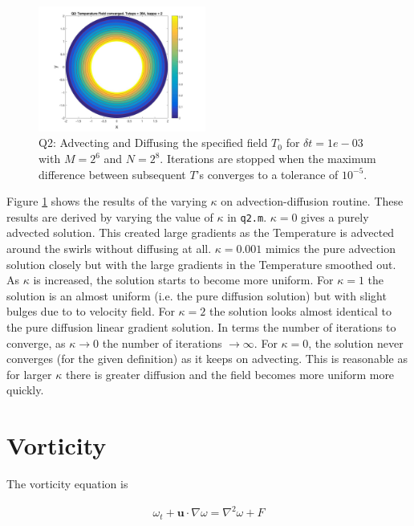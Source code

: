 \documentclass{article}
\begin{document}
\begin{figure}[h!]
		\includegraphics[width = 0.49\textwidth]{fig_q2Kappa2}
		\caption{Q2: Advecting and Diffusing the specified field $T_0$ for $\delta t = 1e-03$ with $M = 2^6$ and $N=2^8$. Iterations are stopped when the maximum difference between subsequent $T$'s converges to a tolerance of $10^{-5}$.}
		\label{fig:q2Kappa}
	\end{figure}

Figure \ref{fig:q2Kappa} shows the results of the varying $\kappa$ on advection-diffusion routine. These results are derived by varying the value of $\kappa$ in \texttt{q2.m}. $\kappa = 0$ gives a purely advected solution. This created large gradients as the Temperature is advected around the swirls without diffusing at all. $\kappa = 0.001$ mimics the pure advection solution closely but with the large gradients in the Temperature smoothed out. As $\kappa$ is increased, the solution starts to become more uniform. For $\kappa=1$ the solution is an almost uniform (i.e. the pure diffusion solution) but with slight bulges due to to velocity field. For $\kappa = 2$ the solution looks almost identical to the pure diffusion linear gradient solution. In terms the number of iterations to converge, as $\kappa \rightarrow 0$ the number of iterations $\rightarrow \infty$. For $\kappa = 0$, the solution never converges (for the given definition) as it keeps on advecting. This is reasonable as for larger $\kappa$ there is greater diffusion and the field becomes more uniform more quickly. 

\section{Vorticity}

The vorticity equation is

\begin{align}
	\omega_t + \textbf{u} \cdot \nabla \omega = \nabla^2 \omega + F
\end{align}
\end{document}
